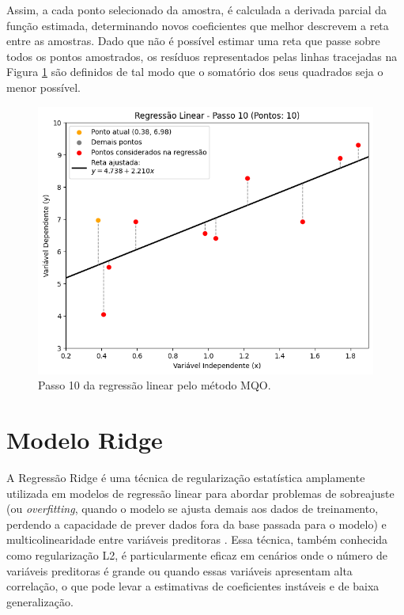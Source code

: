 Assim, a cada ponto selecionado da amostra, é calculada a derivada parcial da função estimada, determinando novos coeficientes que melhor descrevem a reta entre as amostras. Dado que não é possível estimar uma reta que passe sobre todos os pontos amostrados, os resíduos representados pelas linhas tracejadas na Figura \ref{fig:mqo_10} são definidos de tal modo que o somatório dos seus quadrados seja o menor possível.


\begin{figure}[H]
	\caption{\label{fig:mqo_10}Passo 10 da regressão linear pelo método MQO.}
	\begin{center}
		\includegraphics[scale=0.6]{figuras/RL_step_10.png}
	\end{center}
\end{figure}


\section{Modelo Ridge}
\label{sec:regressao-ridge}

A Regressão Ridge é uma técnica de regularização estatística amplamente utilizada em modelos de regressão linear para abordar problemas de sobreajuste (ou \textit{overfitting}, quando o modelo se ajusta demais aos dados de treinamento, perdendo a capacidade de prever dados fora da base passada para o modelo) e multicolinearidade entre variáveis preditoras \cite{McDonald:2009:RR}. Essa técnica, também conhecida como regularização L2, é particularmente eficaz em cenários onde o número de variáveis preditoras é grande ou quando essas variáveis apresentam alta correlação, o que pode levar a estimativas de coeficientes instáveis e de baixa generalização.

